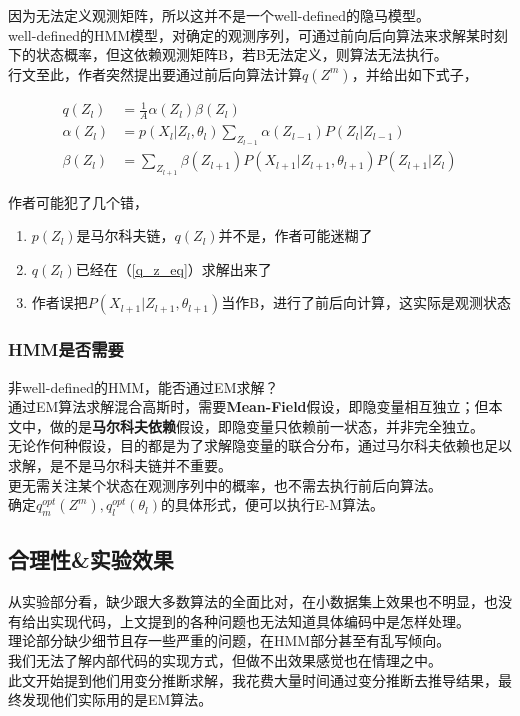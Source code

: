 		因为无法定义观测矩阵，所以这并不是一个well-defined的隐马模型。\\

		well-defined的HMM模型，对确定的观测序列，可通过前向后向算法来求解某时刻下的状态概率，但这依赖观测矩阵B，若B无法定义，则算法无法执行。\\

		行文至此，作者突然提出要通过前后向算法计算$q(Z^m)$，并给出如下式子，

		\begin{align*}
			q(Z_l) &= \frac{1}{A}\alpha(Z_{l})\beta(Z_l)\\
			\alpha(Z_{l}) &= p(X_l|Z_l,\theta_l)\sum_{Z_{l-1}}\alpha(Z_{l-1})P(Z_l|Z_{l-1})\\
			\beta(Z_l) &= \sum_{Z_{l+1}}\beta(Z_{l+1})P(X_{l+1}|Z_{l+1},\theta_{l+1})P(Z_{l+1}|Z_l)
		\end{align*}

		作者可能犯了几个错，
		\begin{enumerate}
			\item $p(Z_l)$是马尔科夫链，$q(Z_l)$并不是，作者可能迷糊了
			\item $q(Z_l)$已经在（\ref{q_z_eq}）求解出来了
			\item 作者误把$P(X_{l+1}|Z_{l+1},\theta_{l+1})$当作B，进行了前后向计算，这实际是观测状态
		\end{enumerate}

	\subsubsection*{HMM是否需要}

		非well-defined的HMM，能否通过EM求解？\\

		通过EM算法求解混合高斯时，需要\textbf{Mean-Field}假设，即隐变量相互独立；但本文中，做的是\textbf{马尔科夫依赖}假设，即隐变量只依赖前一状态，并非完全独立。\\

		无论作何种假设，目的都是为了求解隐变量的联合分布，通过马尔科夫依赖也足以求解，是不是马尔科夫链并不重要。\\

		更无需关注某个状态在观测序列中的概率，也不需去执行前后向算法。\\

		确定$q^{opt}_m(Z^m), q^{opt}_l(\theta_l)$的具体形式，便可以执行E-M算法。
	
\subsection{合理性\&实验效果}

	从实验部分看，缺少跟大多数算法的全面比对，在小数据集上效果也不明显，也没有给出实现代码，上文提到的各种问题也无法知道具体编码中是怎样处理。\\

	理论部分缺少细节且存一些严重的问题，在HMM部分甚至有乱写倾向。\\

	我们无法了解内部代码的实现方式，但做不出效果感觉也在情理之中。\\

	此文开始提到他们用变分推断求解，我花费大量时间通过变分推断去推导结果，最终发现他们实际用的是EM算法。

